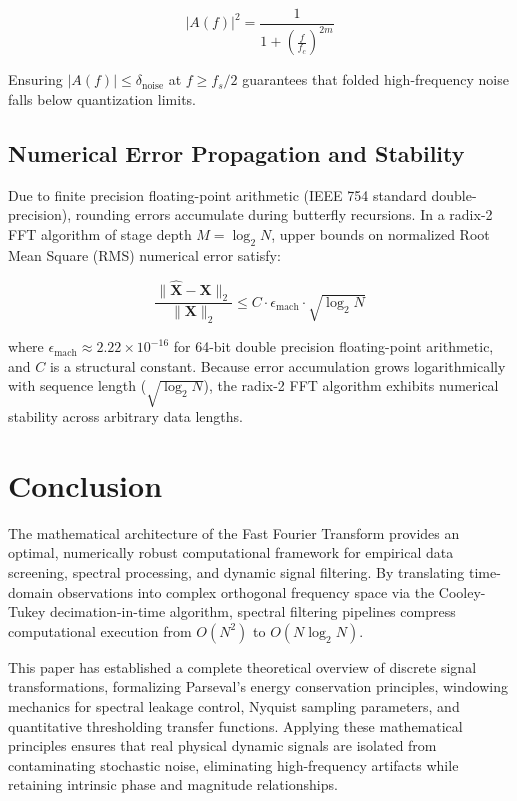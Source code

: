 \documentclass[11pt,a4paper]{article}
\begin{document}
\begin{equation}
|A(f)|^2 = \frac{1}{1 + \left( \frac{f}{f_c} \right)^{2m}}
\end{equation}

Ensuring $|A(f)| \le \delta_{\text{noise}}$ at $f \ge f_s/2$ guarantees that folded high-frequency noise falls below quantization limits.

\subsection{Numerical Error Propagation and Stability}

Due to finite precision floating-point arithmetic (IEEE 754 standard double-precision), rounding errors accumulate during butterfly recursions. In a radix-2 FFT algorithm of stage depth $M = \log_2 N$, upper bounds on normalized Root Mean Square (RMS) numerical error satisfy:

\begin{equation}
\frac{\|\hat{\mathbf{X}} - \mathbf{X}\|_2}{\|\mathbf{X}\|_2} \le C \cdot \epsilon_{\text{mach}} \cdot \sqrt{\log_2 N}
\end{equation}

where $\epsilon_{\text{mach}} \approx 2.22 \times 10^{-16}$ for 64-bit double precision floating-point arithmetic, and $C$ is a structural constant. Because error accumulation grows logarithmically with sequence length ($\sqrt{\log_2 N}$), the radix-2 FFT algorithm exhibits numerical stability across arbitrary data lengths.

\section{Conclusion}

The mathematical architecture of the Fast Fourier Transform provides an optimal, numerically robust computational framework for empirical data screening, spectral processing, and dynamic signal filtering. By translating time-domain observations into complex orthogonal frequency space via the Cooley-Tukey decimation-in-time algorithm, spectral filtering pipelines compress computational execution from $O(N^2)$ to $O(N \log_2 N)$. 

This paper has established a complete theoretical overview of discrete signal transformations, formalizing Parseval's energy conservation principles, windowing mechanics for spectral leakage control, Nyquist sampling parameters, and quantitative thresholding transfer functions. Applying these mathematical principles ensures that real physical dynamic signals are isolated from contaminating stochastic noise, eliminating high-frequency artifacts while retaining intrinsic phase and magnitude relationships.
\end{document}
